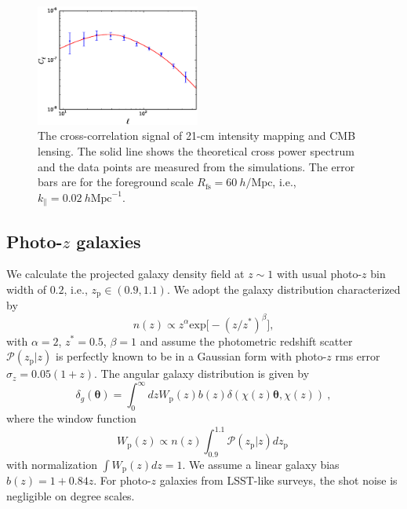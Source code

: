 \documentclass[prd,superscriptaddress,floatfix,notitlepage,nofootinbib,reprint]{revtex4-1}
\newcommand{\mr}{\mathrm}
\newcommand{\kpa}{k_\parallel}
\newcommand{\bea}{\begin{equation}}
\newcommand{\eea}{\end{equation}}
\begin{document}
\begin{figure}[tbp]
\begin{center}
\includegraphics[width=0.48\textwidth]{./figs/f4.eps}
\end{center}
\vspace{-0.7cm}
\caption{The cross-correlation signal of 21-cm intensity mapping and CMB 
    lensing. The solid line shows the theoretical cross power spectrum and the
    data points are measured from the simulations. 
    The error bars are for the foreground scale $R_\mr{fs}=60\ h/\mr{Mpc}$, 
    i.e., $\kpa=0.02\ h\mr{Mpc}^{-1}$.
}
\label{fig:xcc1}
\end{figure}

\subsection{Photo-$z$ galaxies}

We calculate the projected galaxy density field at $z\sim 1$ with usual photo-$z$ bin width of $0.2$, i.e., $z_\mr{p}\in(0.9,1.1)$.
We adopt the galaxy distribution characterized by 
\bea
n(z)\propto z^{\alpha}\mr{exp}\big[-(z/z^{*})^\beta\big],
\eea
with $\alpha=2$, $z^*=0.5$, $\beta=1$ and assume the photometric redshift
scatter $\mathcal{P}(z_\mr{p}|z)$ is perfectly known to be in a Gaussian form 
with photo-$z$ rms error $\sigma_z=0.05(1+z)$.
The angular galaxy distribution is given by
\bea
\delta_g(\bm{\theta})=\int_0^\infty dzW_\mr{p}(z)b(z)
\delta(\chi(z)\bm{\theta},\chi(z))\ ,
\eea
where the window function 
\bea
W_\mr{p}(z)\propto n(z)\int_{0.9}^{1.1} \mathcal{P}(z_\mr{p}|z) dz_\mr{p}\ 
\eea
with normalization $\int W_\mr{p}(z)dz=1$. 
We assume a linear galaxy bias $b(z)=1+0.84z$.
For photo-$z$ galaxies from LSST-like surveys, the shot noise is negligible
on degree scales. 
\end{document}
